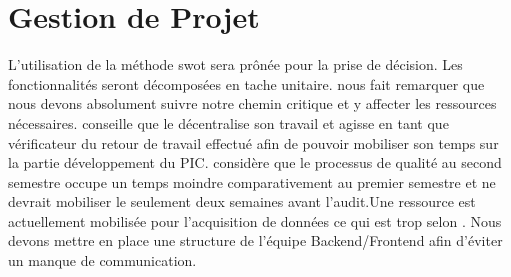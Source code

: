 \documentclass [a4paper] {article}
\begin{document}
\section{Gestion de Projet}
L'utilisation de la méthode swot sera prônée pour la prise de décision. Les fonctionnalités seront décomposées en tache unitaire.
\nomTuteurPedago{} nous fait remarquer que nous devons absolument suivre notre chemin critique et y affecter les ressources nécessaires.
\nomTuteurPedago{} conseille que le \RQ{} décentralise son travail et agisse en tant que vérificateur du retour de travail effectué afin de pouvoir mobiliser son temps sur la partie développement du PIC.
\nomTuteurPedago{} considère que le processus de qualité au second semestre occupe un temps moindre comparativement au premier semestre et ne devrait mobiliser le \RQ{} seulement deux semaines avant l'audit.Une ressource est actuellement mobilisée pour l'acquisition de données ce qui est trop selon \nomTuteurPedago. Nous devons mettre en place une structure de l'équipe Backend/Frontend afin d'éviter un manque de communication.


\newpage
\end{document}
